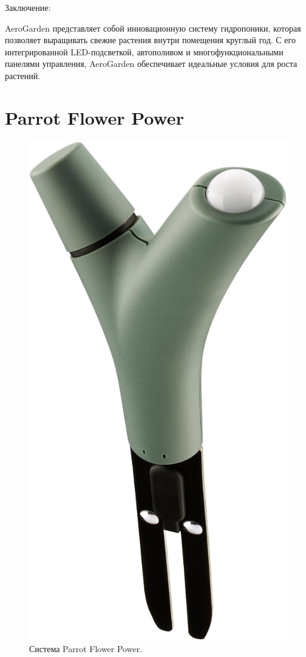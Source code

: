 Заключение:

AeroGarden представляет собой инновационную систему гидропоники, которая позволяет выращивать свежие растения внутри помещения круглый год. С его интегрированной LED-подсветкой, автополивом и многофункциональными панелями управления, AeroGarden обеспечивает идеальные условия для роста растений.

\section{Parrot Flower Power}

\begin{figure}[H]
    \centering
    \includegraphics[scale=0.35]{images/ParrotFlowerPower.png}
    \caption{Система Parrot Flower Power.}
    \label{fig:ParrotFlowerPower}
\end{figure}

